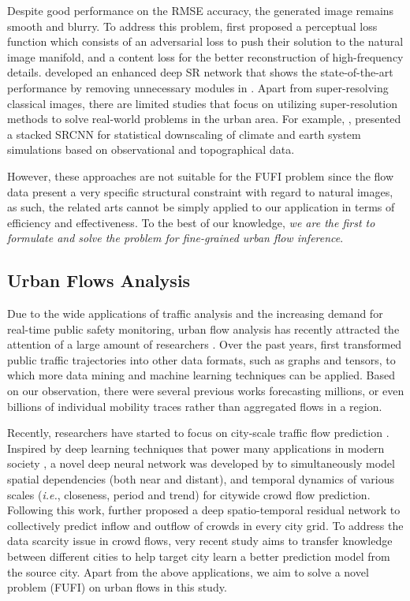 Despite good performance on the RMSE accuracy, the generated image remains smooth and blurry. To address this problem, \citeauthor{ledig2017srgan} \cite{ledig2017srgan} first proposed a perceptual loss function which consists of an adversarial loss to push their solution to the natural image manifold, and a content loss for the better reconstruction of high-frequency details. \citeauthor{lim2017enhanced} \cite{lim2017enhanced} developed an enhanced deep SR network that shows the state-of-the-art performance by removing unnecessary modules in \cite{ledig2017srgan}. Apart from super-resolving classical images, there are limited studies that focus on utilizing super-resolution methods to solve real-world problems in the urban area. For example, \citeauthor{vandal2017deepsd} \cite{vandal2017deepsd}, presented a stacked SRCNN \cite{dong2016srcnn} for statistical downscaling of climate and earth system simulations based on observational and topographical data.

However, these approaches are not suitable for the FUFI problem since the flow data present a very specific structural constraint with regard to natural images, as such, the related arts cannot be simply applied to our application in terms of efficiency and effectiveness. To the best of our knowledge, \emph{we are the first to formulate and solve the problem for fine-grained urban flow inference}.

\subsection{Urban Flows Analysis}
Due to the wide applications of traffic analysis and the increasing demand for real-time public safety monitoring, urban flow analysis has recently attracted the attention of a large amount of researchers \cite{zheng2014urban}. Over the past years, \citeauthor{zheng2014urban} \cite{zheng2014urban} first transformed public traffic trajectories into other data formats, such as graphs and tensors, to which more data mining and machine learning techniques can be applied. Based on our observation, there were several previous works \cite{song2014prediction,fan2015citymomentum} forecasting millions, or even billions of individual mobility traces rather than aggregated flows in a region.

Recently, researchers have started to focus on city-scale traffic flow prediction \cite{hoang2016fccf}. Inspired by deep learning techniques that power many applications in modern society \cite{lecun2015deep}, a novel deep neural network was developed by \citeauthor{zhang2016dnn} \cite{zhang2016dnn} to simultaneously model spatial dependencies (both near and distant), and temporal dynamics of various scales (\emph{i.e.}, closeness, period and trend) for citywide crowd flow prediction. Following this work, \citeauthor{zhang2017deep} \cite{zhang2017deep} further proposed a deep spatio-temporal residual network to collectively predict inflow and outflow of crowds in every city grid. To address the data scarcity issue in crowd flows, very recent study \cite{wang2018crowd} aims to transfer knowledge between different cities to help target city learn a better prediction model from the source city. Apart from the above applications, we aim to solve a novel problem (FUFI) on urban flows in this study.
